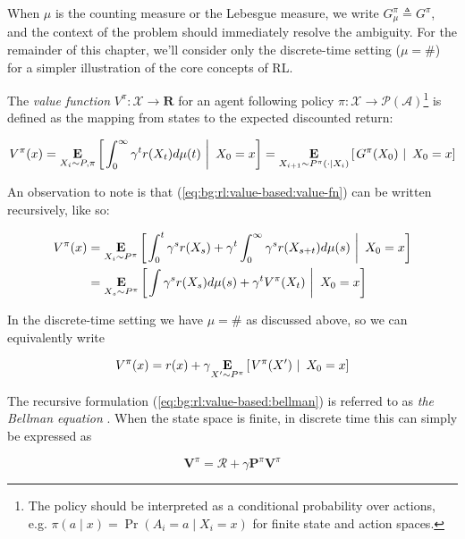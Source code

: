 When $\mu$ is the counting measure or the Lebesgue measure, we write
$G^\pi_\mu\triangleq G^\pi$, and the context of the problem should immediately
resolve the ambiguity. For the remainder of this chapter, we'll
consider only the discrete-time setting ($\mu=\#$) for a simpler
illustration of the core concepts of RL.

The \emph{value function} $V^\pi:\mathcal{X}\to\mathbf{R}$ for an
agent following policy $\pi:
\mathcal{X}\to\mathscr{P}(\mathcal{A})$\footnote{The policy should be
  interpreted as a conditional probability over actions, e.g. $\pi(a\mid x)
  = \Pr(A_i=a\mid X_i=x)$ for finite state and action spaces.} is
defined as the mapping from states to the expected discounted return:

\begin{equation}
  \label{eq:bg:rl:value-based:value-fn}
  V^\pi(x) = \underset{X_i\sim P,
    \pi}{\mathbf{E}}\left[\left. \int_0^\infty\gamma^tr(X_t)d\mu(t)\ \right\rvert\ X_0 =
      x\right] = \underset{X_{i+1}\sim P^\pi(\cdot\mid
    X_i)}{\mathbf{E}}\left[\left. G^\pi(X_0)\ \right\rvert\ X_0 = x\right]
\end{equation}

An observation to note is that (\ref{eq:bg:rl:value-based:value-fn}) can be
written recursively, like so:

\begin{equation}
  \label{eq:bg:rl:value-based:bellman}
  \begin{aligned}
    V^\pi(x) &= \underset{X_i\sim
      P^\pi}{\mathbf{E}}\left[\left. \int_0^t\gamma^sr(X_s) +
      \gamma^t\int_{0}^\infty\gamma^{s}r(X_{s+t})d\mu(s)\ \right\rvert\ X_0 = x\right]\\
    &= \underset{X_s\sim
      P^\pi}{\mathbf{E}}\left[\left. \int\gamma^sr(X_s)d\mu(s) + \gamma^tV^\pi(X_t)\ \right\rvert\ X_0 = x\right]
\end{aligned}
\end{equation}

In the discrete-time setting we have $\mu=\#$ as discussed above, so we can equivalently write

\begin{align*}
  V^\pi(x) = r(x) + \gamma\underset{X'\sim P^\pi}{\mathbf{E}}\left[\left. V^\pi(X')\ \right\rvert\ X_0 = x\right]
\end{align*}

The recursive formulation (\ref{eq:bg:rl:value-based:bellman})
is referred to as \emph{the Bellman equation}
\citep{bellman1954theory}. When the state space is finite, in discrete
time this can simply be expressed as

\begin{equation}
  \label{eq:bg:rl:value-based:bellman:linear}
  \pmb{V}^\pi = \pmb{\mathcal{R}} + \gamma\pmb{P}^\pi\pmb{V}^\pi
\end{equation}

